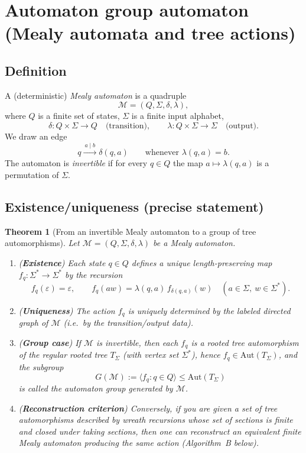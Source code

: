 \documentclass[11pt]{article}
\newtheorem{theorem}{Theorem}[section]
\theoremstyle{definition}
\theoremstyle{plain}
\theoremstyle{remark}
\begin{document}
\section{Automaton group automaton (Mealy automata and tree actions)}

\subsection*{Definition}
A (deterministic) \emph{Mealy automaton} is a quadruple
\[
\mathcal M=(Q,\Sigma,\delta,\lambda),
\]
where $Q$ is a finite set of states, $\Sigma$ is a finite input alphabet,
\[
\delta:Q\times\Sigma\to Q \quad\text{(transition)},\qquad
\lambda:Q\times\Sigma\to \Sigma \quad\text{(output)}.
\]
We draw an edge
\[
q \xrightarrow{\ a\mid b\ } \delta(q,a)
\qquad\text{whenever } \lambda(q,a)=b.
\]
The automaton is \emph{invertible} if for every $q\in Q$ the map $a\mapsto \lambda(q,a)$ is a permutation of $\Sigma$.

\subsection*{Existence/uniqueness (precise statement)}
\begin{theorem}[From an invertible Mealy automaton to a group of tree automorphisms]\label{thm:mealy-to-group}
Let $\mathcal M=(Q,\Sigma,\delta,\lambda)$ be a Mealy automaton.
\begin{enumerate}[leftmargin=2.2em]
\item (\textbf{Existence}) Each state $q\in Q$ defines a unique length-preserving map
$f_q:\Sigma^*\to\Sigma^*$ by the recursion
\[
f_q(\varepsilon)=\varepsilon,\qquad
f_q(a w)=\lambda(q,a)\, f_{\delta(q,a)}(w)\quad (a\in\Sigma,\ w\in\Sigma^*).
\]

\item (\textbf{Uniqueness}) The action $f_q$ is uniquely determined by the labeled directed graph of $\mathcal M$
(i.e.\ by the transition/output data).

\item (\textbf{Group case}) If $\mathcal M$ is invertible, then each $f_q$ is a rooted tree automorphism of the regular rooted tree $T_\Sigma$
(with vertex set $\Sigma^*$), hence $f_q\in\mathrm{Aut}(T_\Sigma)$, and the subgroup
\[
G(\mathcal M):=\langle f_q:q\in Q\rangle \le \mathrm{Aut}(T_\Sigma)
\]
is called the \emph{automaton group} generated by $\mathcal M$.

\item (\textbf{Reconstruction criterion}) Conversely, if you are given a set of tree automorphisms described by wreath recursions
whose set of \emph{sections} is finite and closed under taking sections, then one can reconstruct an equivalent finite Mealy automaton
producing the same action (Algorithm~B below).
\end{enumerate}
\end{theorem}
\end{document}
